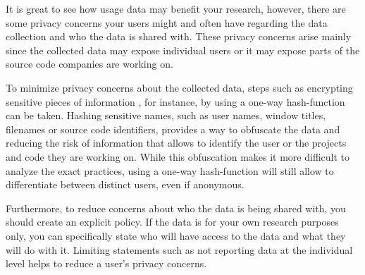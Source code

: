 It is great to see how usage data may benefit your research, however, there are some privacy concerns your users might and often have regarding the data collection and who the data is shared with. These privacy concerns arise mainly since the collected data may expose individual users or it may expose parts of the source code companies are working on.


To minimize privacy concerns about the collected data, steps such as encrypting sensitive pieces of information , for instance, by using a one-way hash-function can be taken. Hashing sensitive names, such as user names, window titles, filenames or source code identifiers, provides a way to obfuscate the data and reducing the risk of information that allows to identify the user or the projects and code they are working on. While this obfuscation makes it more difficult to analyze the exact practices, using a one-way hash-function will still allow to differentiate between distinct users, even if anonymous.


Furthermore, to reduce concerns about who the data is being shared with, you should create an explicit policy. If the data is for your own research purposes only, you can specifically state who will have access to the data and what they will do with it. Limiting statements such as not reporting data at the individual level helps to reduce a user's privacy concerns.
